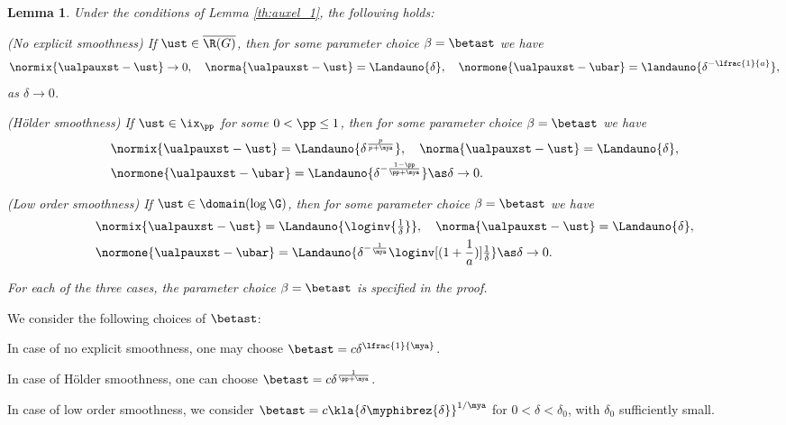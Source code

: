 \documentclass[10pt]{article}
\newtheorem{lemma}[theorem]{Lemma}
\theoremstyle{definition}
\begin{document}
\begin{lemma}
\label{th:auxel_2}
%
Under the conditions of Lemma \ref{th:auxel_1}, the following holds:
%
\begin{mylist_indent}
\item (No explicit smoothness) If
$ \ust \in \overline{\R(G)} $, then
for some parameter choice $ \beta = \betast $
we have
%
\begin{align}
\normix{\ualpauxst - \ust} \to 0,
\quad
\norma{\ualpauxst - \ust} = \Landauno{\delta},
\quad
\normone{\ualpauxst - \ubar} = \landauno{\delta^{-\lfrac{1}{a}}},
\label{eq:auxel-2-a}
\end{align}
%
as $ \delta \to 0 $.


\item (H\"older smoothness)
If $ \ust \in \ix_\pp $ for some $ 0 < \pp \le 1 $,
then for some parameter choice $ \beta = \betast $
we have
%
\begin{align}
& \normix{\ualpauxst - \ust} = \Landauno{\delta^{\frac{p}{p+\mya}}},
\quad
\norma{\ualpauxst - \ust}
= \Landauno{\delta}, \nonumber \\
& \normone{\ualpauxst - \ubar} = \Landauno{\delta^{-\frac{1-\pp}{\pp+\mya}}}
\as \delta \to 0.
\label{eq:auxel-2-n}
\end{align}

\item (Low order smoothness)
If $ \ust \in \domain(\log \G) $, then for some parameter choice $ \beta = \betast $
we have
%
\begin{align}
& \normix{\ualpauxst - \ust} = \Landauno{\loginv{\tfrac{1}{\delta}}},
\quad
\norma{\ualpauxst - \ust}
= \Landauno{\delta}, \nonumber \\
& \normone{\ualpauxst - \ubar} = \Landauno{\delta^{-\frac{1}{\mya}} \loginv[(1+\frac{1}{a})]{\tfrac{1}{\delta}}}
\as \delta \to 0.
\label{eq:auxel-2-c}
\end{align}
\end{mylist_indent}
%
For each of the three cases, the parameter choice $ \beta = \betast $ is specified in the proof.
\end{lemma}
%
\proof
We consider the following choices of $ \betast $:
%
\begin{mylist_indent}
\item In case of no explicit smoothness, one may choose
$ \betast = c \delta^{\lfrac{1}{\mya}} $.
\item In case of H\"older smoothness, one can choose
$ \betast = c \delta^{\frac{1}{\pp+\mya}} $.
\item In case of low order smoothness, we consider
$ \betast = c \kla{\delta \myphibrez{\delta}}^{1/\mya} $
for $ 0 < \delta < \delta_0 $, with
$ \delta_0 $ sufficiently small.
\end{mylist_indent}
\end{document}
